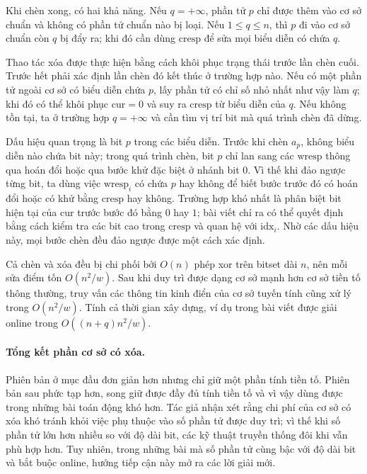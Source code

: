 \documentclass[11pt]{article}
\begin{document}
Khi chèn xong, có hai khả năng. Nếu \(q=+\infty\), phần tử \(p\) chỉ được thêm
vào cơ sở chuẩn và không có phần tử chuẩn nào bị loại. Nếu \(1\le q\le n\), thì
\(p\) đi vào cơ sở chuẩn còn \(q\) bị đẩy ra; khi đó cần dùng \(\mathrm{cresp}\)
để sửa mọi biểu diễn có chứa \(q\).

Thao tác xóa được thực hiện bằng cách khôi phục trạng thái trước lần chèn cuối.
Trước hết phải xác định lần chèn đó kết thúc ở trường hợp nào. Nếu có một phần
tử ngoài cơ sở có biểu diễn chứa \(p\), lấy phần tử có chỉ số nhỏ nhất như vậy
làm \(q\); khi đó có thể khôi phục \(\mathrm{cur}=0\) và suy ra
\(\mathrm{cresp}\) từ biểu diễn của \(q\). Nếu không tồn tại, ta ở trường hợp
\(q=+\infty\) và cần tìm vị trí bit mà quá trình chèn đã dừng.

Dấu hiệu quan trọng là bit \(p\) trong các biểu diễn. Trước khi chèn \(a_p\),
không biểu diễn nào chứa bit này; trong quá trình chèn, bit \(p\) chỉ lan sang
các \(\mathrm{wresp}\) thông qua hoán đổi hoặc qua bước khử đặc biệt ở nhánh
bit \(0\). Vì thế khi đảo ngược từng bit, ta dùng việc
\(\mathrm{wresp}_i\) có chứa \(p\) hay không để biết bước trước đó có hoán đổi
hoặc có khử bằng \(\mathrm{cresp}\) hay không. Trường hợp khó nhất là phân biệt
bit hiện tại của \(\mathrm{cur}\) trước bước đó bằng \(0\) hay \(1\); bài viết
chỉ ra có thể quyết định bằng cách kiểm tra các bit cao trong
\(\mathrm{cresp}\) và quan hệ với \(\mathrm{idx}_i\). Nhờ các dấu hiệu này, mọi
bước chèn đều đảo ngược được một cách xác định.

Cả chèn và xóa đều bị chi phối bởi \(O(n)\) phép xor trên bitset dài \(n\), nên
mỗi sửa điểm tốn \(O(n^2/w)\). Sau khi duy trì được dạng cơ sở mạnh hơn cơ sở
tiền tố thông thường, truy vấn các thông tin kinh điển của cơ sở tuyến tính
cũng xử lý trong \(O(n^2/w)\). Tính cả thời gian xây dựng, ví dụ trong bài viết
được giải online trong \(O((n+q)n^2/w)\).

\paragraph{Tổng kết phần cơ sở có xóa.}
Phiên bản ở mục đầu đơn giản hơn nhưng chỉ giữ một phần tính tiền tố. Phiên bản
sau phức tạp hơn, song giữ được đầy đủ tính tiền tố và vì vậy dùng được trong
những bài toán động khó hơn. Tác giả nhận xét rằng chi phí của cơ sở có xóa khó
tránh khỏi việc phụ thuộc vào số phần tử được duy trì; vì thế khi số phần tử
lớn hơn nhiều so với độ dài bit, các kỹ thuật truyền thống đôi khi vẫn phù hợp
hơn. Tuy nhiên, trong những bài mà số phần tử cùng bậc với độ dài bit và bắt
buộc online, hướng tiếp cận này mở ra các lời giải mới.
\end{document}
